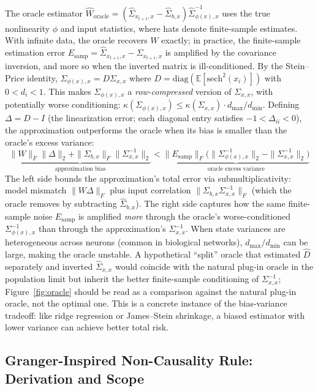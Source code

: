 \documentclass{article}
\begin{document}
The oracle estimator $\hat{W}_{\text{oracle}} = (\hat{\Sigma}_{x_{t+1},x} - \hat{\Sigma}_{b,x}) \hat{\Sigma}_{\phi(x),x}^{-1}$ uses the true nonlinearity $\phi$ and input statistics, where hats denote finite-sample estimates.
With infinite data, the oracle recovers $W$ exactly; in practice, the finite-sample estimation error $E_{\text{samp}} = \hat{\Sigma}_{x_{t+1},x} - \Sigma_{x_{t+1},x}$ is amplified by the covariance inversion, and more so when the inverted matrix is ill-conditioned.
By the Stein--Price identity, $\Sigma_{\phi(x),x} = D \Sigma_{x,x}$ where $D = \text{diag}(\mathbb{E}[\text{sech}^2(x_i)])$ with $0 < d_i < 1$.
This makes $\Sigma_{\phi(x),x}$ a \emph{row-compressed} version of $\Sigma_{x,x}$, with potentially worse conditioning: $\kappa(\Sigma_{\phi(x),x}) \leq \kappa(\Sigma_{x,x}) \cdot d_{\max}/d_{\min}$.
Defining $\Delta = D - I$ (the linearization error; each diagonal entry satisfies $-1 < \Delta_{ii} < 0$), the approximation outperforms the oracle when its bias is smaller than the oracle's excess variance:
\begin{equation}
    \underbrace{\|W\|_F \|\Delta\|_2 + \|\Sigma_{b,x}\|_F \|\Sigma_{x,x}^{-1}\|_2}_{\text{approximation bias}} < \underbrace{\|E_{\text{samp}}\|_F \big(\|\Sigma_{\phi(x),x}^{-1}\|_2 - \|\Sigma_{x,x}^{-1}\|_2\big)}_{\text{oracle excess variance}}
\end{equation}
The left side bounds the approximation's total error via submultiplicativity: model mismatch $\|W\Delta\|_F$ plus input correlation $\|\Sigma_{b,x}\Sigma_{x,x}^{-1}\|_F$ (which the oracle removes by subtracting $\hat{\Sigma}_{b,x}$).
The right side captures how the same finite-sample noise $E_{\text{samp}}$ is amplified \emph{more} through the oracle's worse-conditioned $\Sigma_{\phi(x),x}^{-1}$ than through the approximation's $\Sigma_{x,x}^{-1}$.
When state variances are heterogeneous across neurons (common in biological networks), $d_{\max}/d_{\min}$ can be large, making the oracle unstable.
A hypothetical ``split'' oracle that estimated $\hat D$ separately and inverted $\hat\Sigma_{x,x}$ would coincide with the natural plug-in oracle in the population limit but inherit the better finite-sample conditioning of $\Sigma_{x,x}^{-1}$; Figure~\ref{fig:oracle} should be read as a comparison against the natural plug-in oracle, not the optimal one.
This is a concrete instance of the bias-variance tradeoff: like ridge regression or James--Stein shrinkage, a biased estimator with lower variance can achieve better total risk.

\subsection{Granger-Inspired Non-Causality Rule: Derivation and Scope}
\label{sec:app_granger_rule}
\end{document}
